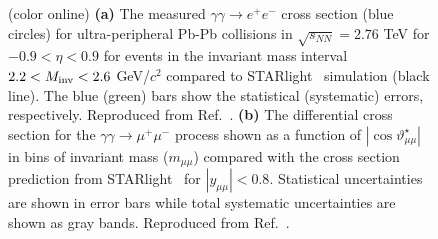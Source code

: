 \documentclass[twocolumn,epjc3]{svjour3}\sloppy
\begin{document}
\begin{figure}
\begin{subfigure}{.40\textwidth}
      \caption{}
    \end{subfigure}
    \caption{
        (color online) 
    \textbf{(a)} The measured $\gamma\gamma \rightarrow e^+e^-$ cross section (blue circles) for ultra-peripheral Pb-Pb collisions in $\sqrt{s_{NN}} = 2.76$ TeV for $-0.9 < \eta < 0.9$ for events in the invariant mass interval $2.2 <M_{\rm inv} < 2.6$ GeV/$c^2$ compared to STARlight~\cite{kleinSTARlightMonteCarlo2017b} simulation (black line). The blue (green) bars show the statistical (systematic) errors, respectively. Reproduced from Ref.~\cite{abbasCharmoniumPairPhotoproduction2013a}.
    \textbf{(b)} 
    The differential cross section for the $\gamma\gamma \rightarrow \mu^+\mu^-$ process shown as a function of $|\cos \vartheta^{\star}_{\mu\mu}|$ in bins of invariant mass ($m_{\mu\mu}$) compared with the cross section prediction from STARlight~\cite{kleinSTARlightMonteCarlo2017b} for $|y_{\mu\mu}| < 0.8$. Statistical uncertainties are shown in error bars while total systematic uncertainties are shown as gray bands. Reproduced from Ref.~\cite{atlascollaborationExclusiveDimuonProduction2020}.
    }
    \label{fig:starlight_data}
\end{figure}

\end{document}
